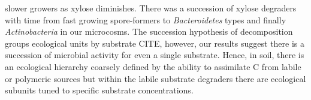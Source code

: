 slower growers as xylose diminishes. There was a succession of xylose degraders
with time from fast growing spore-formers to \textit{Bacteroidetes} types and
finally \textit{Actinobacteria} in our microcosms. The succession hypothesis of
decomposition groups ecological units by substrate CITE, however, our results
suggest there is a succession of microbial activity for even a single
substrate. Hence, in soil, there is an ecological hierarchy coarsely defined by
the ability to assimilate C from labile or polymeric sources but within the
labile substrate degraders there are ecological subunits tuned to specific
substrate concentrations.















